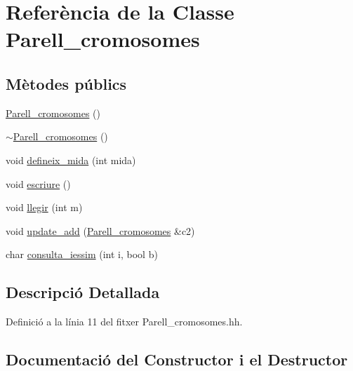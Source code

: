 \hypertarget{class_parell__cromosomes}{}\section{Referència de la Classe Parell\+\_\+cromosomes}
\label{class_parell__cromosomes}
\subsection*{Mètodes públics}
\begin{DoxyCompactItemize}
\item 
\hyperlink{class_parell__cromosomes_a7985c1aa62522044b5e713e065d91463}{Parell\+\_\+cromosomes} ()
\item 
\hyperlink{class_parell__cromosomes_ab7e38b5cc5e8e728e1267c130fe9703f}{$\sim$\+Parell\+\_\+cromosomes} ()
\item 
void \hyperlink{class_parell__cromosomes_a5d285308201b215a7a623b50d77303f7}{defineix\+\_\+mida} (int mida)
\item 
void \hyperlink{class_parell__cromosomes_a0e2fd939a27050532d2100914c95d52a}{escriure} ()
\item 
void \hyperlink{class_parell__cromosomes_a053940b142884c6102c7fa1442e4895d}{llegir} (int m)
\item 
void \hyperlink{class_parell__cromosomes_afe8e6815bd5062c0f6ec1d4e8c978b4f}{update\+\_\+add} (\hyperlink{class_parell__cromosomes}{Parell\+\_\+cromosomes} \&c2)
\item 
char \hyperlink{class_parell__cromosomes_a052e58cf7a4bb19fd680655c028e411b}{consulta\+\_\+iessim} (int i, bool b)
\end{DoxyCompactItemize}


\subsection{Descripció Detallada}


Definició a la línia 11 del fitxer Parell\+\_\+cromosomes.\+hh.



\subsection{Documentació del Constructor i el Destructor}
